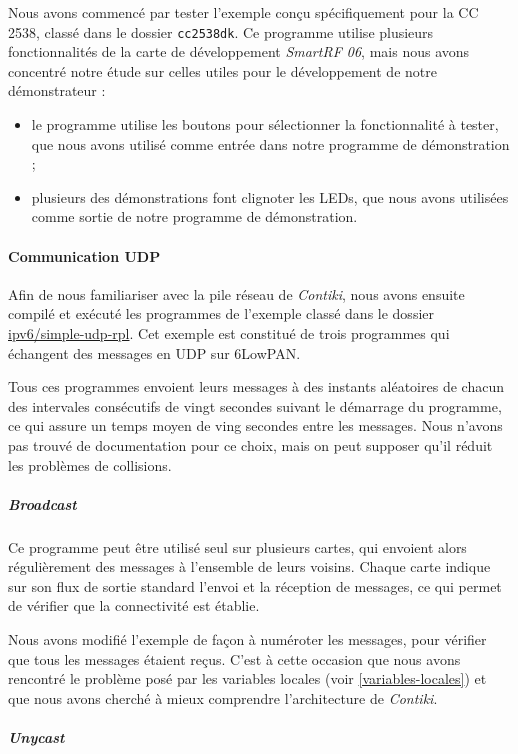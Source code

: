 Nous avons commencé par tester l’exemple conçu spécifiquement pour la CC 2538, classé dans le dossier \texttt{cc2538dk}.
Ce programme utilise plusieurs fonctionnalités de la carte de développement \emph{SmartRF 06}, mais nous avons concentré notre étude sur celles utiles pour le développement de notre démonstrateur :

\begin{itemize}
	\item le programme utilise les boutons pour sélectionner la fonctionnalité à tester, que nous avons utilisé comme entrée dans notre programme de démonstration ;
	\item plusieurs des démonstrations font clignoter les LEDs, que nous avons utilisées comme sortie de notre programme de démonstration.
\end{itemize}

\paragraph{Communication UDP}

Afin de nous familiariser avec la pile réseau de \emph{Contiki}, nous avons ensuite compilé et exécuté les programmes de l’exemple classé dans le dossier \url{ipv6/simple-udp-rpl}.
Cet exemple est constitué de trois programmes qui échangent des messages en UDP sur 6LowPAN.

Tous ces programmes envoient leurs messages à des instants aléatoires de chacun des intervales consécutifs de vingt secondes suivant le démarrage du programme, ce qui assure un temps moyen de ving secondes entre les messages.
Nous n’avons pas trouvé de documentation pour ce choix, mais on peut supposer qu’il réduit les problèmes de collisions.

\subparagraph{\textit{Broadcast}}

Ce programme peut être utilisé seul sur plusieurs cartes, qui envoient alors régulièrement des messages à l’ensemble de leurs voisins.
Chaque carte indique sur son flux de sortie standard l’envoi et la réception de messages, ce qui permet de vérifier que la connectivité est établie.

Nous avons modifié l’exemple de façon à numéroter les messages, pour vérifier que tous les messages étaient reçus.
C’est à cette occasion que nous avons rencontré le problème posé par les variables locales (voir \cref{variables-locales}) et que nous avons cherché à mieux comprendre l’architecture de \emph{Contiki}.

\subparagraph{\textit{Unycast}}

